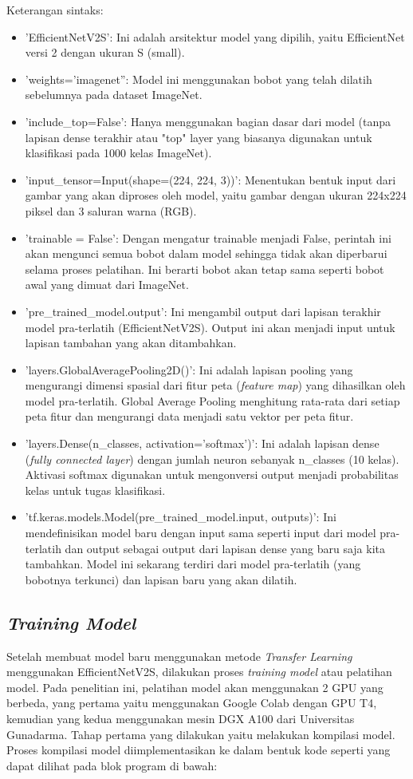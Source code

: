 Keterangan sintaks:
\begin{itemize}
    \item 'EfficientNetV2S': Ini adalah arsitektur model yang dipilih, yaitu EfficientNet versi 2 dengan ukuran S (small).
    \item 'weights='imagenet'': Model ini menggunakan bobot yang telah dilatih sebelumnya pada dataset ImageNet.
    \item 'include\_top=False': Hanya menggunakan bagian dasar dari model (tanpa lapisan dense terakhir atau "top" layer yang biasanya digunakan untuk klasifikasi pada 1000 kelas ImageNet).
    \item 'input\_tensor=Input(shape=(224, 224, 3))': Menentukan bentuk input dari gambar yang akan diproses oleh model, yaitu gambar dengan ukuran 224x224 piksel dan 3 saluran warna (RGB).
    \item 'trainable = False': Dengan mengatur trainable menjadi False, perintah ini akan mengunci semua bobot dalam model sehingga tidak akan diperbarui selama proses pelatihan. Ini berarti bobot akan tetap sama seperti bobot awal yang dimuat dari ImageNet.
    \item 'pre\_trained\_model.output': Ini mengambil output dari lapisan terakhir model pra-terlatih (EfficientNetV2S). Output ini akan menjadi input untuk lapisan tambahan yang akan ditambahkan.
    \item 'layers.GlobalAveragePooling2D()': Ini adalah lapisan pooling yang mengurangi dimensi spasial dari fitur peta (\textit{feature map}) yang dihasilkan oleh model pra-terlatih. Global Average Pooling menghitung rata-rata dari setiap peta fitur dan mengurangi data menjadi satu vektor per peta fitur.
    \item 'layers.Dense(n\_classes, activation='softmax')': Ini adalah lapisan dense (\textit{fully connected layer}) dengan jumlah neuron sebanyak n\_classes (10 kelas). Aktivasi softmax digunakan untuk mengonversi output menjadi probabilitas kelas untuk tugas klasifikasi.
    \item 'tf.keras.models.Model(pre\_trained\_model.input, outputs)': Ini mendefinisikan model baru dengan input sama seperti input dari model pra-terlatih dan output sebagai output dari lapisan dense yang baru saja kita tambahkan. Model ini sekarang terdiri dari model pra-terlatih (yang bobotnya terkunci) dan lapisan baru yang akan dilatih.
\end{itemize}

\subsection{\textit{Training Model}}
Setelah membuat model baru menggunakan metode \textit{Transfer Learning} menggunakan EfficientNetV2S, dilakukan proses \textit{training model} atau pelatihan model. Pada penelitian ini, pelatihan model akan menggunakan 2 GPU yang berbeda, yang pertama yaitu menggunakan Google Colab dengan GPU T4, kemudian yang kedua menggunakan mesin DGX A100 dari Universitas Gunadarma. Tahap pertama yang dilakukan yaitu melakukan kompilasi model. Proses kompilasi model diimplementasikan ke dalam bentuk kode seperti yang dapat dilihat pada blok program di bawah:

